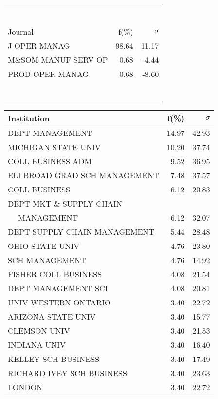 \documentclass[a4paper,11pt]{report}
\begin{document}
\begin{landscape}
\begin{table}[!ht]
{\begin{tabular}{|l r r|}
 &  & \\
 &  & \\
 &  & \\
 &  & \\
 &  & \\
 &  & \\
 &  & \\
\hline
\hline
Journal & f(\%) & $\sigma$\\
\hline
J OPER MANAG & 98.64 & 11.17\\
M\&SOM-MANUF SERV OP & 0.68 & -4.44\\
PROD OPER MANAG & 0.68 & -8.60\\
 &  & \\
 &  & \\
 &  & \\
 &  & \\
 &  & \\
 &  & \\
 &  & \\
\hline
\end{tabular}
}
{\scriptsize\begin{tabular}{|l r r|}
\hline
Institution & f(\%) & $\sigma$\\
\hline
DEPT MANAGEMENT & 14.97 & 42.93\\
MICHIGAN STATE UNIV & 10.20 & 37.74\\
COLL BUSINESS ADM & 9.52 & 36.95\\
ELI BROAD GRAD SCH MANAGEMENT & 7.48 & 37.57\\
COLL BUSINESS & 6.12 & 20.83\\
DEPT MKT \& SUPPLY CHAIN &  & \\
$\quad$ MANAGEMENT & 6.12 & 32.07\\
DEPT SUPPLY CHAIN MANAGEMENT & 5.44 & 28.48\\
OHIO STATE UNIV & 4.76 & 23.80\\
SCH MANAGEMENT & 4.76 & 14.92\\
FISHER COLL BUSINESS & 4.08 & 21.54\\
DEPT MANAGEMENT SCI & 4.08 & 20.81\\
UNIV WESTERN ONTARIO & 3.40 & 22.72\\
ARIZONA STATE UNIV & 3.40 & 15.77\\
CLEMSON UNIV & 3.40 & 21.53\\
INDIANA UNIV & 3.40 & 16.40\\
KELLEY SCH BUSINESS & 3.40 & 17.49\\
RICHARD IVEY SCH BUSINESS & 3.40 & 23.63\\
LONDON & 3.40 & 22.72\\

\end{tabular}}
\end{table}
\end{landscape}
\end{document}
